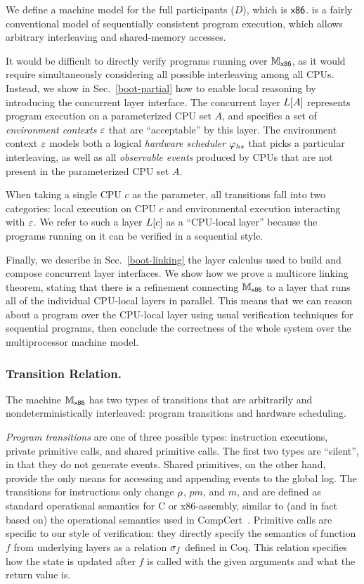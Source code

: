 We define a machine model for the full participants ($D$), which is $\mathsf{x86}$. 
is a fairly conventional model of sequentially consistent program
execution, which allows arbitrary interleaving
and shared-memory
accesses. 


It would be difficult to directly verify programs running 
over $\mathbb{M}_{\mathsf{x86}}$, as it would require
simultaneously considering
all possible interleaving among all CPUs.
Instead, we show in Sec.~\ref{boot-partial} how to enable local reasoning
by introducing the concurrent layer interface.
The concurrent layer $L[A]$ represents program execution 
on a parameterized CPU set $A$,
and specifies a set of \emph{environment contexts} $\oracle$
that are ``acceptable'' by this layer. The environment context $\oracle$
models both a logical \emph{hardware scheduler} $\varphi_{hs}$
that picks a particular interleaving, as well as all 
\emph{observable events} produced by CPUs that are not present in 
the parameterized CPU set $A$.

When taking  a single CPU $c$ as the parameter,
all  transitions
fall into two categories:
local execution on CPU $c$
and environmental execution  interacting with $\oracle$.
We refer to such a layer $L[c]$
as a ``CPU-local layer'' because the programs running on 
it can be verified in a sequential style.

Finally, we describe in Sec.~\ref{boot-linking} the layer calculus used to build and compose concurrent layer interfaces.
We show how we
prove a multicore linking theorem, stating that there is a refinement connecting $\mathbb{M}_{\mathsf{x86}}$ to
a layer that runs all of the individual CPU-local layers 
in parallel.
This means that we can reason about a program over the CPU-local layer
using usual verification techniques for sequential programs,
then conclude the correctness of the whole system over the
multiprocessor machine model.




\subsubsection{Transition Relation.} The machine $\mathbb{M}_{\mathsf{x86}}$
has two types of transitions that are arbitrarily and nondeterministically 
interleaved: 
program transitions and hardware scheduling.

\emph{Program transitions} are one of three possible types:
instruction executions, private primitive calls, and shared primitive calls.
The first two types are ``silent'', in that they do not
generate events.
Shared primitives, on the other hand, provide the only means 
for accessing and appending events to the global log.
The transitions for instructions only change $\rho$, $pm$, and $m$, and are defined as standard operational semantics
for C or x86-assembly, similar to (and in fact based on) the
operational semantics used in
CompCert~\cite{leroy09}. 
Primitive calls are specific to our style of verification: they
directly specify the semantics of function $f$ from underlying layers as a relation $\sigma_f$
defined in Coq. This relation specifies how the state is updated after $f$
is called with the given arguments and what the return value is.

